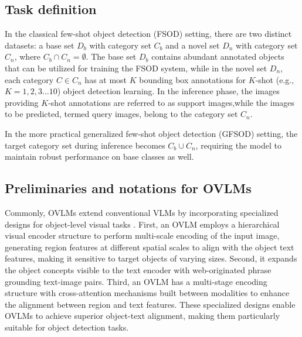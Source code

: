 \documentclass[10pt,twocolumn,letterpaper]{article}
\begin{document}
\subsection{Task definition}
In the classical few-shot object detection (FSOD) setting, there are two distinct datasets: a base set $D_b$ with category set $C_b$ and a novel set $D_n$ with category set $C_n$, where $C_b\cap C_n=\emptyset$. The base set $D_b$ contains abundant annotated objects that can be utilized for training the FSOD system, while in the novel set $D_n$, each category $C\in C_n$ has at most $K$ bounding box annotations for $K$-shot (e.g., $K = 1, 2, 3...10$) object detection learning. In the inference phase, the images providing $K$-shot annotations are referred to as support images,while the images to be predicted, termed query images, belong to the category set $C_n$. 

In the more practical generalized few-shot object detection (GFSOD) setting, the target category set during inference becomes $C_b\cup C_n$, requiring the model to maintain robust performance on base classes as well.

\subsection{Preliminaries and notations for OVLMs}

Commonly, OVLMs extend conventional VLMs by incorporating specialized designs for object-level visual tasks \cite{li2022glip, dou2022fiber, liu2023groundingdino}. First, an OVLM employs a hierarchical visual encoder structure to perform multi-scale encoding of the input image, generating region features at different spatial scales to align with the object text features, making it sensitive to target objects of varying sizes. Second, it expands the object concepts visible to the text encoder with web-originated phrase grounding text-image pairs. Third, an OVLM has a multi-stage encoding structure with cross-attention mechanisms built between modalities to enhance the alignment between region and text features. These specialized designs enable OVLMs to achieve superior object-text alignment, making them particularly suitable for object detection tasks. %
\end{document}
